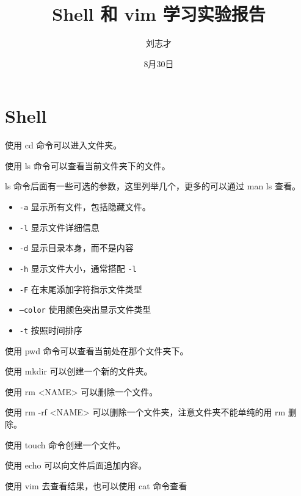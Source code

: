 \documentclass[16pt]{lzc}
\title{Shell 和 vim 学习实验报告}
\author{刘志才}
\date{8月30日}
\begin{document}
    \maketitlepage
    \tableofcontents
    \newpage
    \setcounter{page}{1}


    \section{Shell}\label{sec:shell}

        使用 cd 命令可以进入文件夹。

        使用 ls 命令可以查看当前文件夹下的文件。

        ls 命令后面有一些可选的参数，这里列举几个，更多的可以通过 man ls 查看。
        \begin{itemize}
            \item \texttt{-a} 显示所有文件，包括隐藏文件。
            \item \texttt{-l} 显示文件详细信息
            \item \texttt{-d} 显示目录本身，而不是内容
            \item \texttt{-h} 显示文件大小，通常搭配 \texttt{-l}
            \item \texttt{-F} 在末尾添加字符指示文件类型
            \item \texttt{--color} 使用颜色突出显示文件类型
            \item \texttt{-t} 按照时间排序
        \end{itemize}

        使用 pwd 命令可以查看当前处在那个文件夹下。

        使用 mkdir 可以创建一个新的文件夹。

        使用 rm <NAME> 可以删除一个文件。

        使用 rm -rf <NAME> 可以删除一个文件夹，注意文件夹不能单纯的用 rm 删除。

        使用 touch 命令创建一个文件。

        使用 echo 可以向文件后面追加内容。

        使用 vim 去查看结果，也可以使用 cat 命令查看
\end{document}
